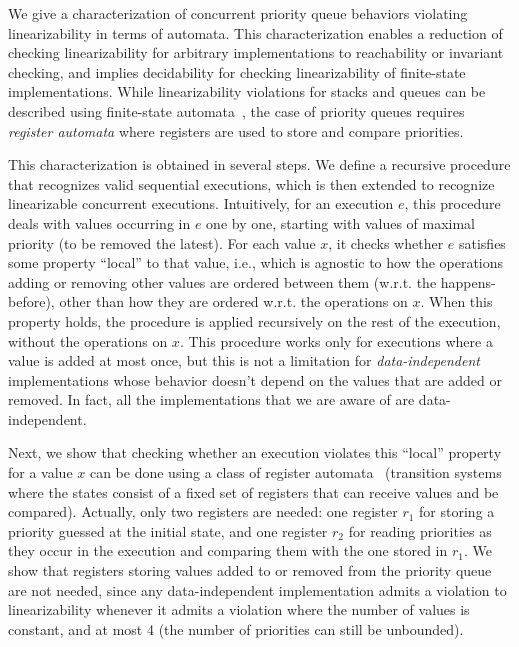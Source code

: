 We give a characterization of concurrent priority queue behaviors violating linearizability in terms of automata. This characterization enables a reduction of checking linearizability for arbitrary implementations to reachability or invariant checking, and implies decidability for checking linearizability of finite-state implementations. While linearizability violations for stacks and queues can be described using finite-state automata~\cite{DBLP:conf/icalp/BouajjaniEEH15}, the case of priority queues requires \emph{register automata} where registers are used to store and compare priorities.

This characterization is obtained in several steps. We define a recursive procedure that recognizes valid sequential executions, which is then extended to recognize linearizable concurrent executions. Intuitively, for an execution $e$, this procedure deals with values occurring in $e$ one by one, starting with values of maximal priority (to be removed the latest). For each value $x$, it checks whether $e$ satisfies some property ``local'' to that value, i.e., which is agnostic to how the operations adding or removing other values are ordered between them (w.r.t. the happens-before), other than how they are ordered w.r.t. the operations on $x$. When this property holds, the procedure is applied recursively on the rest of the execution, without the operations on $x$. This procedure works only for executions where a value is added at most once, but this is not a limitation for \emph{data-independent} implementations whose behavior doesn't depend on the values that are added or removed. In fact, all the implementations that we are aware of are data-independent.

Next, we show that checking whether an execution violates this ``local'' property for a value $x$ can be done using a class of register automata~\cite{DBLP:journals/tcs/KaminskiF94,DBLP:conf/icalp/Cerans94,DBLP:conf/stacs/SegoufinT11} (transition systems where the states consist of a fixed set of registers that can receive values and be compared). Actually, only two registers are needed: one register $r_1$ for storing a priority guessed at the initial state, and one register $r_2$ for reading priorities as they occur in the execution and comparing them with the one stored in $r_1$. We show that registers storing values added to or removed from the priority queue are not needed, since any data-independent implementation admits a violation to linearizability whenever it admits a violation where the number of values is constant, and at most 4 (the number of priorities can still be unbounded).

